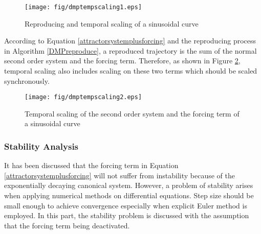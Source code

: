\begin{figure}[H]
	\centering
	\texttt{[image: fig/dmptempscaling1.eps]}
	\caption{Reproducing and temporal scaling of a sinusoidal curve}
	\label{dmptempscaling1}
\end{figure} 

According to Equation {\ref{attractorsystemplusforcing}} and the reproducing process in Algorithm {\ref{DMPreproduce}}, a reproduced trajectory is the sum of the normal second order system and the forcing term. Therefore, as shown in Figure {\ref{dmptempscaling2}}, temporal scaling also includes scaling on these two terms which should be scaled synchronously.

\begin{figure}[H]
	\centering
	\texttt{[image: fig/dmptempscaling2.eps]}
	\caption{Temporal scaling of the second order system and the forcing term of a sinusoidal curve}
	\label{dmptempscaling2}
\end{figure} 

\subsubsection{Stability Analysis}
It has been discussed that the forcing term in Equation {\ref{attractorsystemplusforcing}} will not suffer from instability because of the exponentially decaying canonical system. However, a problem of stability arises when applying numerical methods on differential equations. Step size should be small enough to achieve convergence especially when explicit Euler method is employed. In this part, the stability problem is discussed with the assumption that the forcing term being deactivated.

